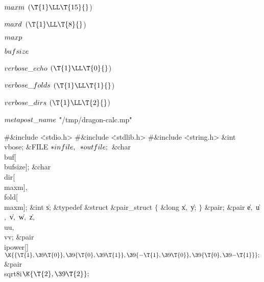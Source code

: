 \Y\B\4\D$\\{maxm}$ \5
$(\T{1}\LL\T{15}{}$)\par
\B\4\D$\\{maxd}$ \5
$(\T{1}\LL\T{8}{}$)\par
\B\4\D$\\{maxp}$ \5
\par
\B\4\D$\\{bufsize}$ \5
\par
\B\4\D$\\{verbose\_echo}$ \5
$(\T{1}\LL\T{0}{}$)\par
\B\4\D$\\{verbose\_folds}$ \5
$(\T{1}\LL\T{1}{}$)\par
\B\4\D$\\{verbose\_dirs}$ \5
$(\T{1}\LL\T{2}{}$)\par
\B\4\D$\\{metapost\_name}$ \5
\.{"/tmp/dragon-calc.mp}\)\.{"}\par
\Y\B\8\#\&{include} \.{<stdio.h>}\6
\8\#\&{include} \.{<stdlib.h>}\6
\8\#\&{include} \.{<string.h>}\6
\&{int} \\{vbose};\6
\&{FILE} ${}{*}\\{infile},{}$ ${}{*}\\{outfile};{}$\6
\&{char} \\{buf}[\\{bufsize}];\6
\&{char} \\{dir}[\\{maxm}]${},{}$ \\{fold}[\\{maxm}];\6
\&{int} \|s;\6
\&{typedef} \&{struct} \&{pair\_struct} ${}\{{}$\1\6
\&{long} \|x${},{}$ \|y;\2\6
${}\}{}$ \&{pair};\6
\&{pair} \|e${},{}$ \|u${},{}$ \|v${},{}$ \|w${},{}$ \|z${},{}$ \\{uu}${},{}$ %
\\{vv};\6
\&{pair} \\{ipower}[]${}\K\{\{\T{1},\39\T{0}\},\39\{\T{0},\39\T{1}\},\39%
\{{-}\T{1},\39\T{0}\},\39\{\T{0},\39{-}\T{1}\}\};{}$\6
\&{pair} \\{sqrt8i}${}\K\{\T{2},\39\T{2}\};{}$\6
